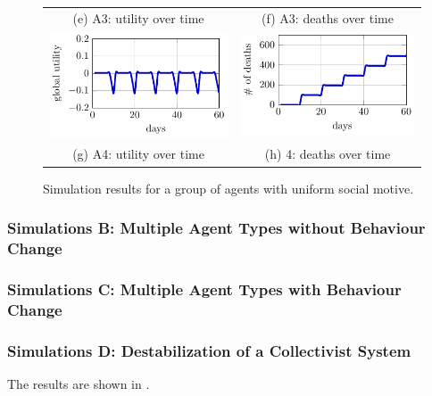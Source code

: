 \begin{figure}[htb]
\begin{tabular}{cc}
    (e) A3: utility over time & (f) A3: deaths over time
    \\[8pt]
     \includegraphics[width=0.3\linewidth]{008_team_6_agent_design/A/SOMAS_A4_utility.pdf} &   \includegraphics[width=0.3\linewidth]{008_team_6_agent_design/A/SOMAS_A4_deaths.pdf} \\[0pt]
    (g) A4: utility over time & (h) 4: deaths over time
    \end{tabular}
    \caption{Simulation results for a group of agents with uniform social motive.}
    \label{fig:res_A}%
\end{figure}

\subsubsection{Simulations B: Multiple Agent Types without Behaviour Change}


\subsubsection{Simulations C: Multiple Agent Types with Behaviour Change}


\subsubsection{Simulations D: Destabilization of a Collectivist System}
 The results are shown in .
 

